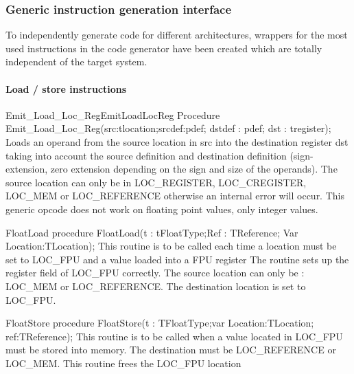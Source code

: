 \documentclass [a4paper,12pt]{article}
\begin{document}
\subsubsection{Generic instruction generation interface}
\label{subsubsec:generic}

To independently generate code for different architectures, wrappers for the
most used instructions in the code generator have been created which are
totally independent of the target system.

\paragraph{Load / store instructions}

\begin{procedurel}{Emit\_Load\_Loc\_Reg}{EmitLoadLocReg}
\Declaration
Procedure Emit{\_}Load{\_}Loc{\_}Reg(src:tlocation;srcdef:pdef; dstdef : pdef; dst : tregister);
\Description
Loads an operand from the source location in \textsf{src }into the
destination register \textsf{dst }taking into account the source definition
and destination definition (sign-extension, zero extension depending on the
sign and size of the operands).
\Notes
The source location can only be in LOC{\_}REGISTER, LOC{\_}CREGISTER,
LOC{\_}MEM or LOC{\_}REFERENCE otherwise an internal error will occur. This
generic opcode does not work on floating point values, only integer values.
\end{procedurel}

\begin{procedure}{FloatLoad}
\Declaration
procedure FloatLoad(t : tFloatType;Ref : TReference; Var Location:TLocation);
\Description
This routine is to be called each time a location must be set to LOC{\_}FPU
and a value loaded into a FPU register
\Notes
The routine sets up the register field of LOC{\_}FPU correctly. The source
location can only be : LOC{\_}MEM or LOC{\_}REFERENCE. The destination
location is set to LOC{\_}FPU.
\end{procedure}

\begin{function}{FloatStore}
\Declaration
procedure FloatStore(t : TFloatType;var Location:TLocation; ref:TReference);
\Description
This routine is to be called when a value located in LOC{\_}FPU must be
stored into memory.
\Notes
The destination must be LOC{\_}REFERENCE or LOC{\_}MEM. This routine frees
the LOC{\_}FPU location \\
\end{function}
\end{document}
